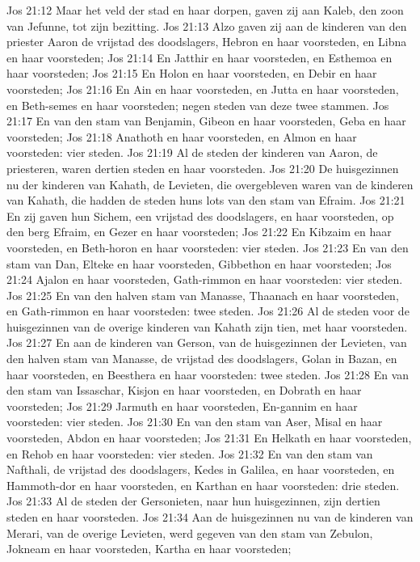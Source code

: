 Jos 21:12  Maar het veld der stad en haar dorpen, gaven zij aan Kaleb, den zoon van Jefunne, tot zijn bezitting.
Jos 21:13  Alzo gaven zij aan de kinderen van den priester Aaron de vrijstad des doodslagers, Hebron en haar voorsteden, en Libna en haar voorsteden;
Jos 21:14  En Jatthir en haar voorsteden, en Esthemoa en haar voorsteden;
Jos 21:15  En Holon en haar voorsteden, en Debir en haar voorsteden;
Jos 21:16  En Ain en haar voorsteden, en Jutta en haar voorsteden, en Beth-semes en haar voorsteden; negen steden van deze twee stammen.
Jos 21:17  En van den stam van Benjamin, Gibeon en haar voorsteden, Geba en haar voorsteden;
Jos 21:18  Anathoth en haar voorsteden, en Almon en haar voorsteden: vier steden.
Jos 21:19  Al de steden der kinderen van Aaron, de priesteren, waren dertien steden en haar voorsteden.
Jos 21:20  De huisgezinnen nu der kinderen van Kahath, de Levieten, die overgebleven waren van de kinderen van Kahath, die hadden de steden huns lots van den stam van Efraim.
Jos 21:21  En zij gaven hun Sichem, een vrijstad des doodslagers, en haar voorsteden, op den berg Efraim, en Gezer en haar voorsteden;
Jos 21:22  En Kibzaim en haar voorsteden, en Beth-horon en haar voorsteden: vier steden.
Jos 21:23  En van den stam van Dan, Elteke en haar voorsteden, Gibbethon en haar voorsteden;
Jos 21:24  Ajalon en haar voorsteden, Gath-rimmon en haar voorsteden: vier steden.
Jos 21:25  En van den halven stam van Manasse, Thaanach en haar voorsteden, en Gath-rimmon en haar voorsteden: twee steden.
Jos 21:26  Al de steden voor de huisgezinnen van de overige kinderen van Kahath zijn tien, met haar voorsteden.
Jos 21:27  En aan de kinderen van Gerson, van de huisgezinnen der Levieten, van den halven stam van Manasse, de vrijstad des doodslagers, Golan in Bazan, en haar voorsteden, en Beesthera en haar voorsteden: twee steden.
Jos 21:28  En van den stam van Issaschar, Kisjon en haar voorsteden, en Dobrath en haar voorsteden;
Jos 21:29  Jarmuth en haar voorsteden, En-gannim en haar voorsteden: vier steden.
Jos 21:30  En van den stam van Aser, Misal en haar voorsteden, Abdon en haar voorsteden;
Jos 21:31  En Helkath en haar voorsteden, en Rehob en haar voorsteden: vier steden.
Jos 21:32  En van den stam van Nafthali, de vrijstad des doodslagers, Kedes in Galilea, en haar voorsteden, en Hammoth-dor en haar voorsteden, en Karthan en haar voorsteden: drie steden.
Jos 21:33  Al de steden der Gersonieten, naar hun huisgezinnen, zijn dertien steden en haar voorsteden.
Jos 21:34  Aan de huisgezinnen nu van de kinderen van Merari, van de overige Levieten, werd gegeven van den stam van Zebulon, Jokneam en haar voorsteden, Kartha en haar voorsteden;
